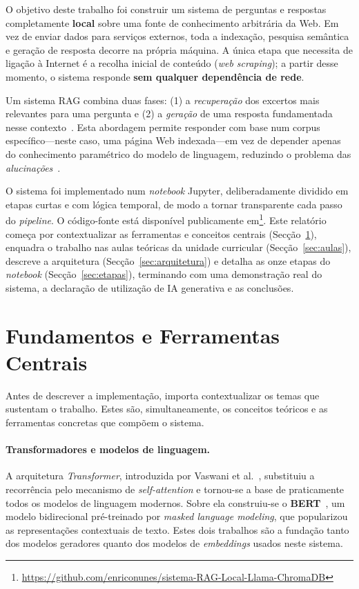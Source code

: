\documentclass[]{ceurart}
\begin{document}
O objetivo deste trabalho foi construir um sistema de perguntas e respostas
completamente \textbf{local} sobre uma fonte de conhecimento arbitrária da Web.
Em vez de enviar dados para serviços externos, toda a indexação, pesquisa
semântica e geração de resposta decorre na própria máquina.
A única etapa que necessita de ligação à Internet é a recolha inicial de
conteúdo (\emph{web scraping}); a partir desse momento, o sistema responde
\textbf{sem qualquer dependência de rede}.

Um sistema RAG combina duas fases: (1) a \emph{recuperação} dos excertos mais
relevantes para uma pergunta e (2) a \emph{geração} de uma resposta fundamentada
nesse contexto~\cite{gao2024rag}. Esta abordagem permite responder com base num
corpus específico---neste caso, uma página Web indexada---em vez de depender
apenas do conhecimento paramétrico do modelo de linguagem, reduzindo
o problema das \emph{alucinações}~\cite{ji2023hallucination}.

O sistema foi implementado num \emph{notebook} Jupyter, deliberadamente dividido
em etapas curtas e com lógica temporal, de modo a tornar transparente cada passo
do \emph{pipeline}. O código-fonte está disponível publicamente
em\footnote{\url{https://github.com/enriconunes/sistema-RAG-Local-Llama-ChromaDB}}.
Este relatório começa por contextualizar as ferramentas e conceitos centrais
(Secção~\ref{sec:fundamentos}), enquadra o trabalho nas aulas teóricas da unidade
curricular (Secção~\ref{sec:aulas}), descreve a arquitetura
(Secção~\ref{sec:arquitetura}) e detalha as onze etapas do
\emph{notebook} (Secção~\ref{sec:etapas}), terminando com uma demonstração real
do sistema, a declaração de utilização de IA generativa e as conclusões.

\section{Fundamentos e Ferramentas Centrais}
\label{sec:fundamentos}

Antes de descrever a implementação, importa contextualizar os temas que sustentam
o trabalho. Estes são, simultaneamente, os conceitos teóricos e as ferramentas
concretas que compõem o sistema.

\paragraph{Transformadores e modelos de linguagem.}
A arquitetura \emph{Transformer}, introduzida por Vaswani et
al.~\cite{vaswani2017attention}, substituiu a recorrência pelo mecanismo de
\emph{self-attention} e tornou-se a base de praticamente todos os modelos de
linguagem modernos. Sobre ela construiu-se o \textbf{BERT}~\cite{devlin2019bert},
um modelo bidirecional pré-treinado por \emph{masked language modeling}, que
popularizou as representações contextuais de texto. Estes dois trabalhos são a
fundação tanto dos modelos geradores quanto dos modelos de \emph{embeddings}
usados neste sistema.
\end{document}

